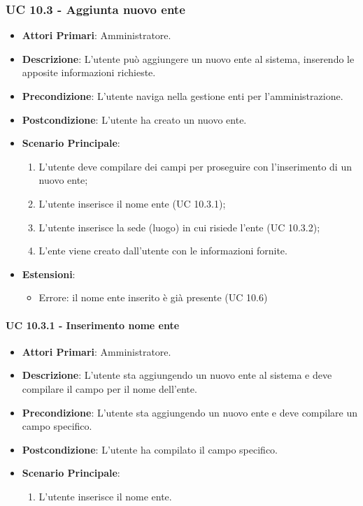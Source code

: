 			\subsubsection{UC 10.3 - Aggiunta nuovo ente}
			\begin{itemize}
				\item \textbf{Attori Primari}: Amministratore.
				\item \textbf{Descrizione}: L'utente può aggiungere un nuovo ente al sistema, inserendo le apposite informazioni richieste.
				\item \textbf{Precondizione}: L'utente naviga nella gestione enti per l'amministrazione.
				\item \textbf{Postcondizione}: L'utente ha creato un nuovo ente.
				\item \textbf{Scenario Principale}:
				\begin{enumerate}
					\item{L'utente deve compilare dei campi per proseguire con l'inserimento di un nuovo ente;}
					\item L'utente inserisce il nome ente (UC 10.3.1);
					\item L'utente inserisce la sede (luogo) in cui risiede l'ente (UC 10.3.2);
					\item{L'ente viene creato dall'utente con le informazioni fornite.}
				\end{enumerate}	
				\item \textbf{Estensioni}:
					\begin{itemize}
						\item Errore: il nome ente inserito è già presente (UC 10.6)
					\end{itemize}
			\end{itemize}	

				\paragraph{UC 10.3.1 - Inserimento nome ente}
				\begin{itemize}
					\item \textbf{Attori Primari}: Amministratore.
					\item \textbf{Descrizione}: L'utente sta aggiungendo un nuovo ente al sistema e deve compilare il campo per il nome dell'ente.
					\item \textbf{Precondizione}: L'utente sta aggiungendo un nuovo ente e deve compilare un campo specifico.
					\item \textbf{Postcondizione}: L'utente ha compilato il campo specifico.
					\item \textbf{Scenario Principale}:
					\begin{enumerate}
						\item L'utente inserisce il nome ente.
					\end{enumerate}	
				\end{itemize}	


